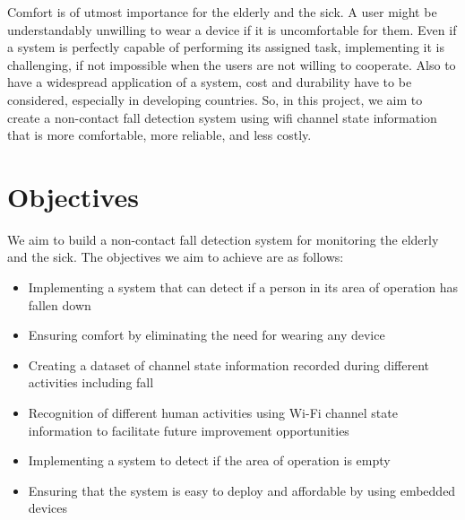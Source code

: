 Comfort is of utmost importance for the elderly and the sick. A user might be understandably unwilling to wear a device if it is uncomfortable for them. Even if a system is perfectly capable of performing its assigned task, implementing it is challenging, if not impossible when the users are not willing to cooperate. Also to have a widespread application of a system, cost and durability have to be considered, especially in developing countries. So, in this project, we aim to create a non-contact fall detection system using wifi channel state information that is more comfortable, more reliable, and less costly.


\section{Objectives}

 We aim to build a non-contact fall detection system for monitoring the elderly and the sick. The objectives we aim to achieve are as follows:

\begin{itemize}
\item Implementing a system that can detect if a person in its area of operation has fallen down
\item Ensuring comfort by eliminating the need for wearing any device
\item Creating a dataset of channel state information recorded during different activities including fall
\item Recognition of different human activities using Wi-Fi channel state information to facilitate future improvement opportunities
\item Implementing a system to detect if the area of operation is empty
\item Ensuring that the system is easy to deploy and affordable by using embedded devices
\end{itemize}
